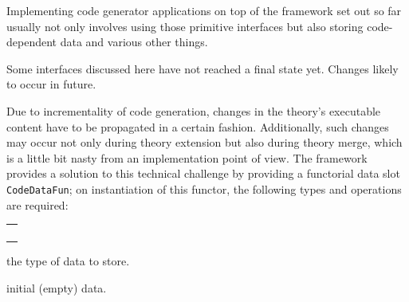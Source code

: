 \begin{isabellebody}
\begin{isamarkuptext}
\begin{description}
  \end{description}%
\end{isamarkuptext}%
\isamarkuptrue%
%
\endisatagmlref
{\isafoldmlref}%
%
\isadelimmlref
%
\endisadelimmlref
%
\isamarkuptrue%
%
\begin{isamarkuptext}%
Implementing code generator applications on top
  of the framework set out so far usually not only
  involves using those primitive interfaces
  but also storing code-dependent data and various
  other things.

  \begin{warn}
    Some interfaces discussed here have not reached
    a final state yet.
    Changes likely to occur in future.
  \end{warn}%
\end{isamarkuptext}%
\isamarkuptrue%
%
\isamarkuptrue%
%
\begin{isamarkuptext}%
Due to incrementality of code generation, changes in the
  theory's executable content have to be propagated in a
  certain fashion.  Additionally, such changes may occur
  not only during theory extension but also during theory
  merge, which is a little bit nasty from an implementation
  point of view.  The framework provides a solution
  to this technical challenge by providing a functorial
  data slot \verb|CodeDataFun|; on instantiation
  of this functor, the following types and operations
  are required:

  \medskip
  \begin{tabular}{l}
  \isa{type\ T} \\
  \isa{val\ empty{\isacharcolon}\ T} \\
  \isa{val\ merge{\isacharcolon}\ Pretty{\isachardot}pp\ {\isasymrightarrow}\ T\ {\isacharasterisk}\ T\ {\isasymrightarrow}\ T} \\
  \isa{val\ purge{\isacharcolon}\ theory\ option\ {\isasymrightarrow}\ CodegenConsts{\isachardot}const\ list\ option\ {\isasymrightarrow}\ T\ {\isasymrightarrow}\ T}
  \end{tabular}

  \begin{description}

  \item {} the type of data to store.

  \item {} initial (empty) data.


\end{description}
\end{isamarkuptext}
\end{isabellebody}
